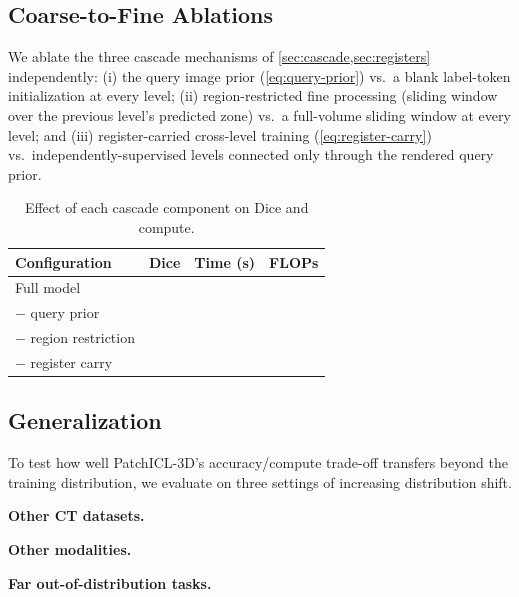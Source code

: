 
\subsection{Coarse-to-Fine Ablations}
\label{sec:c2f-ablation}

We ablate the three cascade mechanisms of \cref{sec:cascade,sec:registers}
independently: (i) the query image prior
(\cref{eq:query-prior}) vs.\ a blank label-token initialization at every
level; (ii) region-restricted fine processing (sliding window over the
previous level's predicted zone) vs.\ a full-volume sliding window at
every level; and (iii) register-carried cross-level training
(\cref{eq:register-carry}) vs.\ independently-supervised levels
connected only through the rendered query prior.

\label{sec:cross-level-ablation}
\begin{table}[t]
\centering
\caption{Effect of each cascade component on Dice and compute.
}
\label{tab:c2f-ablation}
\small
\begin{tabular}{@{}lccc@{}}
\toprule
Configuration & Dice & Time (s) & FLOPs \\
\midrule
Full model & \TODO{} & \TODO{} & \TODO{} \\
$-$ query prior & \TODO{} & \TODO{} & \TODO{} \\
$-$ region restriction & \TODO{} & \TODO{} & \TODO{} \\
$-$ register carry & \TODO{} & \TODO{} & \TODO{} \\
\bottomrule
\end{tabular}
\end{table}


\subsection{Generalization}
\label{sec:generalization}

To test how well PatchICL-3D's accuracy/compute trade-off transfers
beyond the training distribution, we evaluate on three settings of
increasing distribution shift.

\noindent\textbf{Other CT datasets.} 

\noindent\textbf{Other modalities.} 

\noindent\textbf{Far out-of-distribution tasks.} 
